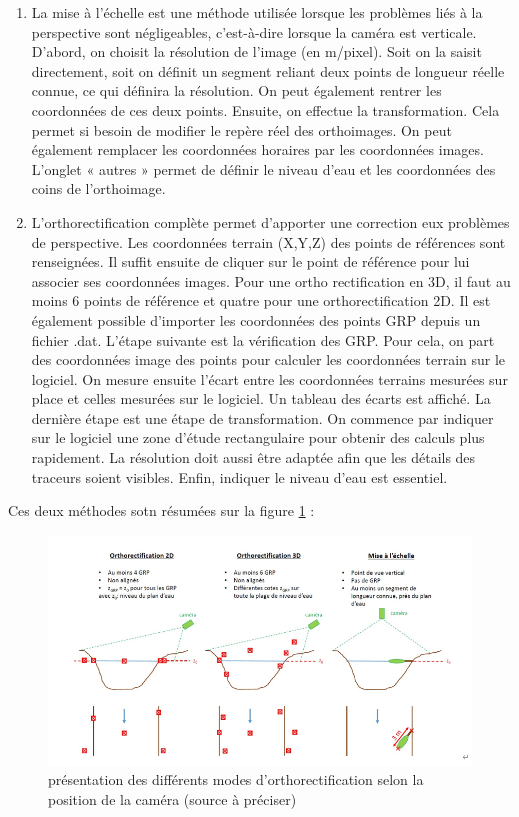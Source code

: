 \documentclass[
]{article}
\begin{document}
\begin{enumerate}
\def\labelenumi{\arabic{enumi}.}
\item
  La mise à l'échelle est une méthode utilisée lorsque les problèmes liés à la perspective sont négligeables, c'est-à-dire lorsque la caméra est verticale. D'abord, on choisit la résolution de l'image (en m/pixel). Soit on la saisit directement, soit on définit un segment reliant deux points de longueur réelle connue, ce qui définira la résolution. On peut également rentrer les coordonnées de ces deux points. Ensuite, on effectue la transformation. Cela permet si besoin de modifier le repère réel des orthoimages. On peut également remplacer les coordonnées horaires par les coordonnées images. L'onglet « autres » permet de définir le niveau d'eau et les coordonnées des coins de l'orthoimage.
\item
  L'orthorectification complète permet d'apporter une correction eux problèmes de perspective. Les coordonnées terrain (X,Y,Z) des points de références sont renseignées. Il suffit ensuite de cliquer sur le point de référence pour lui associer ses coordonnées images. Pour une ortho rectification en 3D, il faut au moins 6 points de référence et quatre pour une orthorectification 2D. Il est également possible d'importer les coordonnées des points GRP depuis un fichier .dat. L'étape suivante est la vérification des GRP. Pour cela, on part des coordonnées image des points pour calculer les coordonnées terrain sur le logiciel. On mesure ensuite l'écart entre les coordonnées terrains mesurées sur place et celles mesurées sur le logiciel. Un tableau des écarts est affiché. La dernière étape est une étape de transformation. On commence par indiquer sur le logiciel une zone d'étude rectangulaire pour obtenir des calculs plus rapidement. La résolution doit aussi être adaptée afin que les détails des traceurs soient visibles. Enfin, indiquer le niveau d'eau est essentiel.
\end{enumerate}

Ces deux méthodes sotn résumées sur la figure \ref{fig:orthowang} :



\begin{figure}
\includegraphics[width=1\linewidth]{images/Orthowang} \caption{présentation des différents modes d'orthorectification selon la position de la caméra (source à préciser)}\label{fig:orthowang}
\end{figure}
\end{document}
